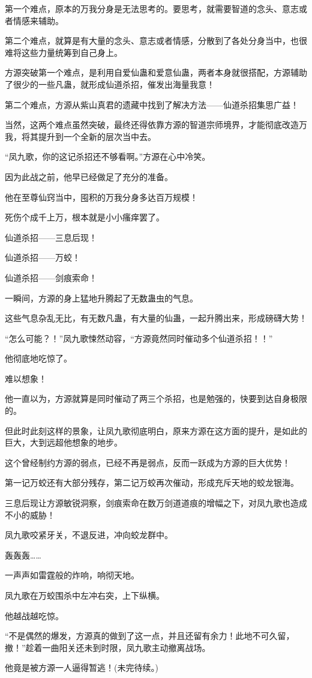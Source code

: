 \begin{this_body}
第一个难点，原本的万我分身是无法思考的。要思考，就需要智道的念头、意志或者情感来辅助。

第二个难点，就算是有大量的念头、意志或者情感，分散到了各处分身当中，也很难将这些力量统筹到自己身上。

方源突破第一个难点，是利用自爱仙蛊和爱意仙蛊，两者本身就很搭配，方源辅助了很少的一些凡蛊，就形成仙道杀招，催发出海量我意！

第二个难点，方源从紫山真君的遗藏中找到了解决方法——仙道杀招集思广益！

当然，这两个难点虽然突破，最终还得依靠方源的智道宗师境界，才能彻底改造万我，将其提升到一个全新的层次当中去。

“凤九歌，你的这记杀招还不够看啊。”方源在心中冷笑。

因为此战之前，他早已经做足了充分的准备。

他在至尊仙窍当中，囤积的万我分身多达百万规模！

死伤个成千上万，根本就是小小瘙痒罢了。

仙道杀招——三息后现！

仙道杀招——万蛟！

仙道杀招——剑痕索命！

一瞬间，方源的身上猛地升腾起了无数蛊虫的气息。

这些气息杂乱无比，有无数凡蛊，有大量的仙蛊，一起升腾出来，形成磅礴大势！

“怎么可能？！”凤九歌悚然动容，“方源竟然同时催动多个仙道杀招！！”

他彻底地吃惊了。

难以想象！

他一直以为，方源就算是同时催动了两三个杀招，也是勉强的，快要到达自身极限的。

但此时此刻这样的景象，让凤九歌彻底明白，原来方源在这方面的提升，是如此的巨大，大到远超他想象的地步。

这个曾经制约方源的弱点，已经不再是弱点，反而一跃成为方源的巨大优势！

第一记万蛟还有大部分残存，第二记万蛟再次催动，形成充斥天地的蛟龙银海。

三息后现让方源敏锐洞察，剑痕索命在数万剑道道痕的增幅之下，对凤九歌也造成不小的威胁！

凤九歌咬紧牙关，不退反进，冲向蛟龙群中。

轰轰轰……

一声声如雷霆般的炸响，响彻天地。

凤九歌在万蛟围杀中左冲右突，上下纵横。

他越战越吃惊。

“不是偶然的爆发，方源真的做到了这一点，并且还留有余力！此地不可久留，撤！”趁着一曲阳关还未到时限，凤九歌主动撤离战场。

他竟是被方源一人逼得暂逃！(未完待续。)

\end{this_body}

